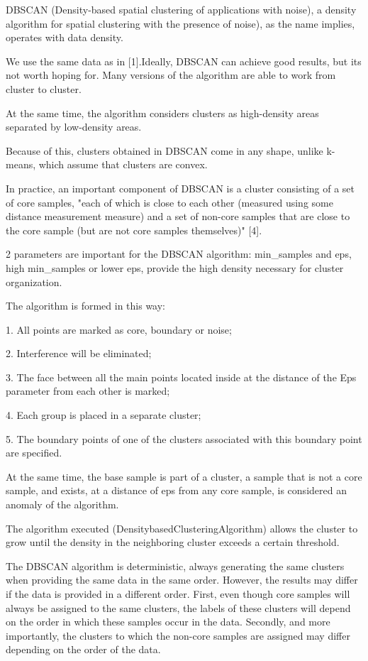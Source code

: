 DBSCAN (Density-based spatial clustering of applications with noise), a
density algorithm for spatial clustering with the presence of noise), as
the name implies, operates with data density.

We use the same data as in {[}1{]}.Ideally, DBSCAN can achieve good
results, but it\textquotesingle s not worth hoping for. Many versions of
the algorithm are able to work from cluster to cluster.

At the same time, the algorithm considers clusters as high-density areas
separated by low-density areas.

Because of this, clusters obtained in DBSCAN come in any shape, unlike
k-means, which assume that clusters are convex.

In practice, an important component of DBSCAN is a cluster consisting of
a set of core samples, "each of which is close to each other (measured
using some distance measurement measure) and a set of non-core samples
that are close to the core sample (but are not core samples themselves)"
{[}4{]}.

2 parameters are important for the DBSCAN algorithm: min\_samples and
eps, high min\_samples or lower eps, provide the high density necessary
for cluster organization.

The algorithm is formed in this way:

1. All points are marked as core, boundary or noise;

2. Interference will be eliminated;

3. The face between all the main points located inside at the distance
of the Eps parameter from each other is marked;

4. Each group is placed in a separate cluster;

5. The boundary points of one of the clusters associated with this
boundary point are specified.

At the same time, the base sample is part of a cluster, a sample that is
not a core sample, and exists, at a distance of eps from any core
sample, is considered an anomaly of the algorithm.

The algorithm executed (DensitybasedClusteringAlgorithm) allows the
cluster to grow until the density in the neighboring cluster exceeds a
certain threshold.

The DBSCAN algorithm is deterministic, always generating the same
clusters when providing the same data in the same order. However, the
results may differ if the data is provided in a different order. First,
even though core samples will always be assigned to the same clusters,
the labels of these clusters will depend on the order in which these
samples occur in the data. Secondly, and more importantly, the clusters
to which the non-core samples are assigned may differ depending on the
order of the data.

